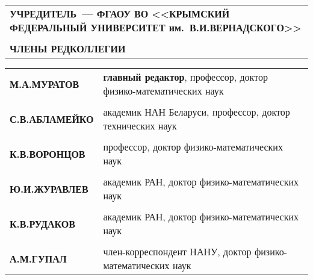 \def\baselinestretch{1}
\thispagestyle{empty}

\myinter=2pt

\parindent=0mm
{\scriptsize\sf
    \renewcommand{\arraystretch}{0}
    \begin{tabular}{l}
        \textbf{УЧРЕДИТЕЛЬ~--- ФГАОУ ВО <<КРЫМСКИЙ ФЕДЕРАЛЬНЫЙ УНИВЕРСИТЕТ им.~В.\;И.\;ВЕРНАДСКОГО>>}\\
        
        \rule{0pt}{0.6cm}\\%
        \textbf{ЧЛЕНЫ РЕДКОЛЛЕГИИ}\\
    \end{tabular}
}

\vspace{0.3cm} {\renewcommand{\arraystretch}{0.4}
\begin{tabular}{ll}
{\qquad\scriptsize\sf \textbf{М.\;А.\;МУРАТОВ}} & {\scriptsize\sf \textbf{главный редактор}, профессор, доктор физико-математических наук}\\

\rule{0pt}{4pt} & \\
{\qquad\scriptsize\sf \textbf{С.\;В.\;АБЛАМЕЙКО}}   & {\scriptsize\sf академик НАН Беларуси, профессор, доктор технических наук}\\

\rule{0pt}{4pt} & \\
{\qquad\scriptsize\sf \textbf{К.\;В.\;ВОРОНЦОВ}}   & {\scriptsize\sf профессор, доктор физико-математических наук}\\

\rule{0pt}{4pt} & \\
{\qquad\scriptsize\sf \textbf{Ю.\;И.\;ЖУРАВЛЕВ}}       & {\scriptsize\sf академик РАН, доктор физико-математических наук}\\

\rule{0pt}{4pt} & \\
{\qquad\scriptsize\sf \textbf{К.\;В.\;РУДАКОВ}}        & {\scriptsize\sf академик РАН, доктор физико-математических наук}\\

\rule{0pt}{4pt} & \\
{\qquad\scriptsize\sf \textbf{А.\;М.\;ГУПАЛ}}          & {\scriptsize\sf член-корреспондент НАНУ, доктор физико-математических наук}\\


\end{tabular}}
